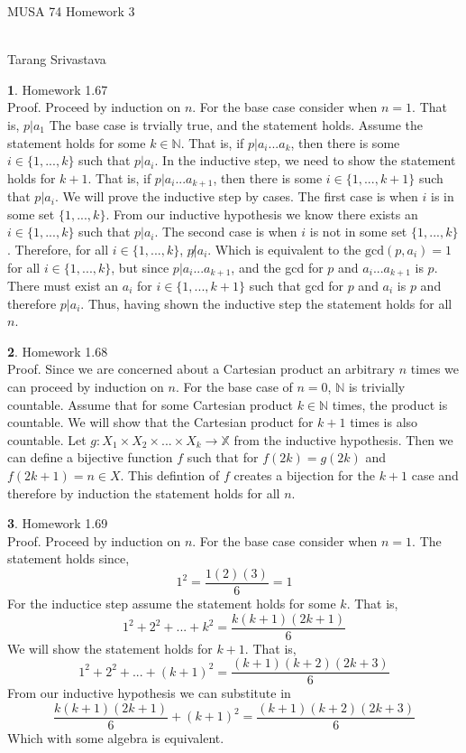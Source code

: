 \documentclass[10pt, twocolumn]{article}
\author{Tarang Srivastava}
\newcommand{\makechaptertitle}[1]{
\begin{center}
	\begin{large}
		#1
	\end{large}
	\begin{small}
		\\Tarang Srivastava
	\end{small}
\end{center}
}
\theoremstyle{definition}
\newtheorem{q}{}
\begin{document}
	
\makechaptertitle{MUSA 74 Homework 3}

\begin{q}
Homework 1.67 \\
Proof. Proceed by induction on $ n $. For the base case consider when $ n = 1 $. That is, $ p|a_1 $
The base case is trvially true, and the statement holds.
Assume the statement holds for some $ k \in \mathbb{N} $.
That is, if $ p|a_i...a_k $, then there is some $ i \in \{1, ..., k\} $ such that $ p|a_i $.
In the inductive step, we need to show the statement holds for $ k + 1 $.
That is, if $ p|a_i...a_{k+1} $, then there is some $ i \in \{1, ..., k+1\} $ such that $ p|a_i $.
We will prove the inductive step by cases.
The first case is when $ i $ is in some set $ \{1, ..., k\} $.
From our inductive hypothesis we know there exists an $ i \in \{1, ..., k\} $ 
such that $ p|a_i $. 
The second case is when $ i $ is not in some set $ \{1, ..., k\} $.
Therefore, for all $ i \in \{1, ..., k\} $, $ p \not | a_i $. 
Which is equivalent to the $ \text{gcd}(p, a_i) = 1 $ for all $ i \in \{1, ..., k\} $, 
but since $ p|a_i...a_{k+1} $, and the gcd for $ p $ and $ a_i...a_{k+1} $ is $ p $. 
There must exist an $ a_i $ for $ i \in \{1,...,k+1\} $ such that gcd for $ p $ and $ a_i $ is $ p $ and therefore $ p|a_i $. 
Thus, having shown the inductive step the statement holds for all $ n $.
\end{q}
\begin{q}
Homework 1.68 \\
Proof. Since we are concerned about a Cartesian product an arbitrary $ n $ times we can proceed by induction on $ n $. 
For the base case of $ n = 0 $, $ \mathbb{N} $ is trivially countable.
Assume that for some Cartesian product $ k \in \mathbb{N} $ times, the product is countable.
We will show that the Cartesian product for $ k + 1 $ times is also countable. 
Let $ g: X_1 \times X_2 \times ... \times X_k \rightarrow \mathbb{X} $ from the inductive hypothesis.
Then we can define a bijective function $ f $ such that for $ f(2k) = g(2k) $ and $ f(2k+1) = n \in X $.
This defintion of $ f $ creates a bijection for the $ k + 1 $ case and therefore by induction the statement holds for all $ n $. \\
\end{q}
\begin{q}
Homework 1.69 \\
Proof. Proceed by induction on $ n $.
For the base case consider when $ n = 1$. 
The statement holds since, 
$$ 1^2 = \dfrac{1(2)(3)}{6} = 1 $$
For the inductice step assume the statement holds for some $ k $.
That is,
$$ 1^2 + 2^2 + ... + k^2 = \dfrac{k(k+1)(2k+1)}{6} $$
We will show the statement holds for $ k + 1 $. That is,
$$ 1^2 + 2^2 + ... + (k+1)^2 = \dfrac{(k+1)(k+2)(2k+3)}{6} $$
From our inductive hypothesis we can substitute in 
$$  \dfrac{k(k+1)(2k+1)}{6} + (k+1)^2 = \dfrac{(k+1)(k+2)(2k+3)}{6} $$
Which with some algebra is equivalent.

\end{q}
\end{document}
